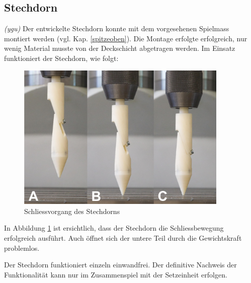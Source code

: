 \subsection{Stechdorn}
\textit{(ygu)} Der entwickelte Stechdorn konnte mit dem vorgesehenen Spielmass montiert werden (vgl. Kap. \ref{spitzeoben}). Die Montage erfolgte erfolgreich, nur wenig Material musste von der Deckschicht abgetragen werden. Im Einsatz funktioniert der Stechdorn, wie folgt:
\begin{figure}[H]
	\includegraphics[draft=false,width=0.9\textwidth]{Illustrationen/7-Inbetriebnahme_und_Kalibration/inbet_stechdorn.jpg}
	\caption{Schliessvorgang des Stechdorns}
	\label{fig:inbet_stechdorn}
\end{figure}
In Abbildung \ref{fig:inbet_stechdorn} ist ersichtlich, dass der Stechdorn die Schliessbewegung erfolgreich ausführt. Auch öffnet sich der untere Teil durch die Gewichtskraft problemlos.
\newline

Der Stechdorn funktioniert einzeln einwandfrei. Der definitive Nachweis der Funktionalität kann nur im Zusammenspiel mit der Setzeinheit erfolgen.